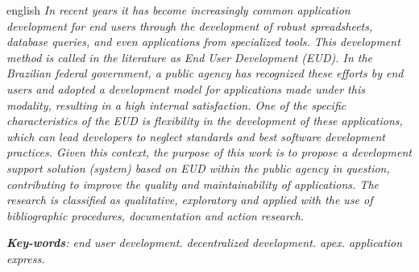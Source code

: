 \begin{resumo}[Abstract]
 \begin{otherlanguage*}{english}
   \textit{In recent years it has become increasingly common application development for end users through the development of robust spreadsheets, database queries, and even applications from specialized tools. This development method is called in the literature as End User Development (EUD). In the Brazilian federal government, a public agency has recognized these efforts by end users and adopted a development model for applications made under this modality, resulting in a high internal satisfaction. One of the specific characteristics of the EUD is flexibility in the development of these applications, which can lead developers to neglect standards and best software development practices. Given this context, the purpose of this work is to propose a development support solution (system) based on EUD within the public agency in question, contributing to improve the quality and maintainability of applications. The research is classified as qualitative, exploratory and applied with the use of bibliographic procedures, documentation and action research.}

   \vspace{\onelineskip}
 
   \noindent 
   \textit{\textbf{Key-words}: end user development. decentralized development. apex. application express.}
 \end{otherlanguage*}
\end{resumo}